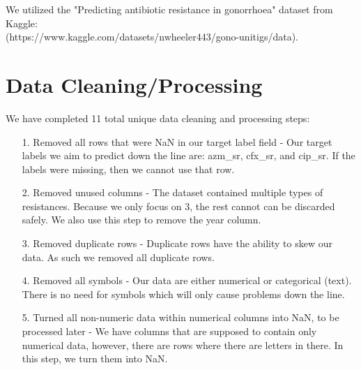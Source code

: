 \documentclass[manuscript,screen,review, nonacm]{acmart}
\begin{document}
    We utilized the "Predicting antibiotic resistance in gonorrhoea" dataset from Kaggle: \\
    (https://www.kaggle.com/datasets/nwheeler443/gono-unitigs/data). \\


\section{Data Cleaning/Processing}

    We have completed 11 total unique data cleaning and processing steps:

    \begin{itemize}
        \item[1.] Removed all rows that were NaN in our target label field - Our target labels we aim to predict down the line
        are: azm\_sr, cfx\_sr, and cip\_sr. If the labels were missing, then we cannot use that row.

        \item[2.] Removed unused columns - The dataset contained multiple types of resistances. Because we only focus on 3, the rest cannot
        can be discarded safely. We also use this step to remove the year column.

        \item[3.] Removed duplicate rows - Duplicate rows have the ability to skew our data. As such we removed all duplicate rows.
        
        \item[4.] Removed all symbols - Our data are either numerical or categorical (text). There is no need for symbols which will
        only cause problems down the line.

        \item[5.] Turned all non-numeric data within numerical columns into NaN, to be processed later - We have columns that are
        supposed to contain only numerical data, however, there are rows where there are letters in there. In this step, we turn them
        into NaN.


\end{itemize}
\end{document}
